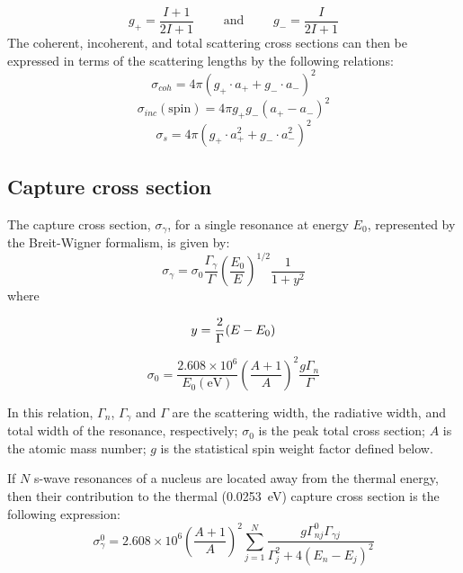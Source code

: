 \documentclass[twocolumn,amsmath,amssymb,10pt,groupedaddress,a4paper]{revtex4}
\begin{document}
\begin{equation}
g_+ = \frac{I+1}{2I+1} \qquad \text{ and } \qquad g_- = \frac{I}{2I+1}
\end{equation}
The coherent, incoherent, and total scattering cross sections can then be expressed in terms of the scattering
lengths by the following relations:
\begin{equation}
\sigma_{coh}=4\pi\left(g_+\cdot a_++ g_-\cdot a_-\right)^2
\end{equation}
\begin{equation}
\sigma_{inc}(\text{spin}) = 4\pi g_+ g_-(a_+-a_-)^2
\end{equation}
\begin{equation}
\sigma_s=4\pi\left(g_+\cdot a_+^2+ g_-\cdot a_-^2 \right)^2
\label{sigs}
\end{equation}



\subsection{Capture cross section}

The capture cross section, $\sigma_\gamma$, for a single resonance at energy $E_0$, represented by the
Breit-Wigner formalism, is given by:
\begin{equation}
 \sigma_\gamma = \sigma_0 \frac{\Gamma_\gamma}{\Gamma} \left( \frac{E_0}{E} \right) ^{1/2} \frac{1}{1+y^2}
\label{sigmagamma}
\end{equation}
\noindent where

\begin{equation}
y = \frac{2}{\Gamma}(E - E_0)  \notag
\end{equation}


\begin{equation}
 \sigma_0 =\frac{2.608 \times 10^6}{E_0 (\text{eV})} \left( \frac{A+1}{A} \right)^2 \frac{g\Gamma_n}{\Gamma}
\end{equation}

In this relation, $\Gamma_n$, $\Gamma_\gamma$ and $\Gamma$ are the scattering width, the radiative width, and total width
of the resonance, respectively; $\sigma_0$ is the peak total cross section; $A$ is the atomic mass number; $g$ is the
statistical spin weight factor defined below.

If $N$ s-wave resonances of a nucleus are located away from the thermal energy, then their contribution to the thermal
(0.0253~eV) capture cross section is the following expression:
\begin{equation}
\sigma_\gamma^0 = 2.608 \times 10^6 \left( \frac{A+1}{A} \right)^2 \sum_{j=1}^N \frac{g\Gamma_{nj}^0\Gamma_{\gamma j}}{\Gamma_j^2+4(E_n-E_j)^2}
\label{sigmagamma0}
\end{equation}
\end{document}
